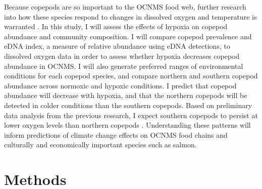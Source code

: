 \documentclass[12pt,twoside]{reedthesis}
\begin{document}
 Because copepods are so important to the OCNMS food web, further research into how these species respond to changes in dissolved oxygen and temperature is warranted \autocite{NOAAFisheries2024}. In this study, I will assess the effects of hypoxia on copepod abundance and community composition. I will compare copepod prevalence and eDNA index, a measure of relative abundance using eDNA detections, to dissolved oxygen data in order to assess whether hypoxia decreases copepod abundance in OCNMS. I will also generate preferred ranges of environmental conditions for each copepod species, and compare northern and southern copepod abundance across normoxic and hypoxic conditions. I predict that copepod abundance will decrease with hypoxia, and that the northern copepods will be detected in colder conditions than the southern copepods. Based on preliminary data analysis from the previous research, I expect southern copepods to persist at lower oxygen levels than northern copepods \autocite{Crotty2024}. Understanding these patterns will inform predictions of climate change effects on OCNMS food chains and culturally and economically important species such as salmon.
	
    \chapter{Methods}
    
\end{document}
